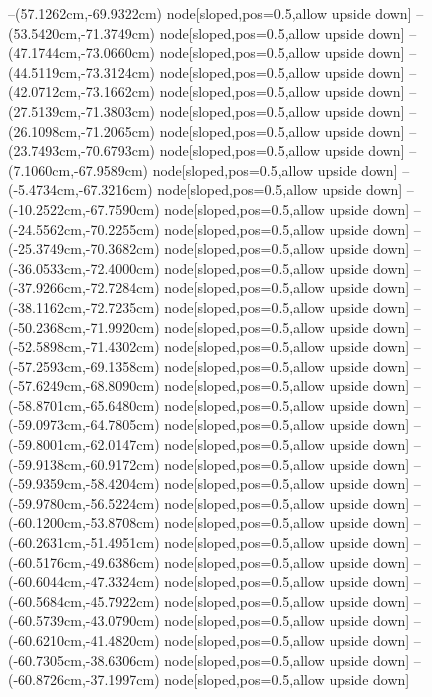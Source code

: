 --(57.1262cm,-69.9322cm) node[sloped,pos=0.5,allow upside down]{\arrowIn}
--(53.5420cm,-71.3749cm) node[sloped,pos=0.5,allow upside down]{\ArrowIn}
--(47.1744cm,-73.0660cm) node[sloped,pos=0.5,allow upside down]{\ArrowIn}
--(44.5119cm,-73.3124cm) node[sloped,pos=0.5,allow upside down]{\ArrowIn}
--(42.0712cm,-73.1662cm) node[sloped,pos=0.5,allow upside down]{\ArrowIn}
--(27.5139cm,-71.3803cm) node[sloped,pos=0.5,allow upside down]{\ArrowIn}
--(26.1098cm,-71.2065cm) node[sloped,pos=0.5,allow upside down]{\ArrowIn}
--(23.7493cm,-70.6793cm) node[sloped,pos=0.5,allow upside down]{\ArrowIn}
--(7.1060cm,-67.9589cm) node[sloped,pos=0.5,allow upside down]{\ArrowIn}
--(-5.4734cm,-67.3216cm) node[sloped,pos=0.5,allow upside down]{\ArrowIn}
--(-10.2522cm,-67.7590cm) node[sloped,pos=0.5,allow upside down]{\ArrowIn}
--(-24.5562cm,-70.2255cm) node[sloped,pos=0.5,allow upside down]{\ArrowIn}
--(-25.3749cm,-70.3682cm) node[sloped,pos=0.5,allow upside down]{\arrowIn}
--(-36.0533cm,-72.4000cm) node[sloped,pos=0.5,allow upside down]{\ArrowIn}
--(-37.9266cm,-72.7284cm) node[sloped,pos=0.5,allow upside down]{\ArrowIn}
--(-38.1162cm,-72.7235cm) node[sloped,pos=0.5,allow upside down]{\arrowIn}
--(-50.2368cm,-71.9920cm) node[sloped,pos=0.5,allow upside down]{\ArrowIn}
--(-52.5898cm,-71.4302cm) node[sloped,pos=0.5,allow upside down]{\ArrowIn}
--(-57.2593cm,-69.1358cm) node[sloped,pos=0.5,allow upside down]{\ArrowIn}
--(-57.6249cm,-68.8090cm) node[sloped,pos=0.5,allow upside down]{\arrowIn}
--(-58.8701cm,-65.6480cm) node[sloped,pos=0.5,allow upside down]{\ArrowIn}
--(-59.0973cm,-64.7805cm) node[sloped,pos=0.5,allow upside down]{\arrowIn}
--(-59.8001cm,-62.0147cm) node[sloped,pos=0.5,allow upside down]{\ArrowIn}
--(-59.9138cm,-60.9172cm) node[sloped,pos=0.5,allow upside down]{\ArrowIn}
--(-59.9359cm,-58.4204cm) node[sloped,pos=0.5,allow upside down]{\ArrowIn}
--(-59.9780cm,-56.5224cm) node[sloped,pos=0.5,allow upside down]{\ArrowIn}
--(-60.1200cm,-53.8708cm) node[sloped,pos=0.5,allow upside down]{\ArrowIn}
--(-60.2631cm,-51.4951cm) node[sloped,pos=0.5,allow upside down]{\ArrowIn}
--(-60.5176cm,-49.6386cm) node[sloped,pos=0.5,allow upside down]{\ArrowIn}
--(-60.6044cm,-47.3324cm) node[sloped,pos=0.5,allow upside down]{\ArrowIn}
--(-60.5684cm,-45.7922cm) node[sloped,pos=0.5,allow upside down]{\ArrowIn}
--(-60.5739cm,-43.0790cm) node[sloped,pos=0.5,allow upside down]{\ArrowIn}
--(-60.6210cm,-41.4820cm) node[sloped,pos=0.5,allow upside down]{\ArrowIn}
--(-60.7305cm,-38.6306cm) node[sloped,pos=0.5,allow upside down]{\ArrowIn}
--(-60.8726cm,-37.1997cm) node[sloped,pos=0.5,allow upside down]{\ArrowIn}
